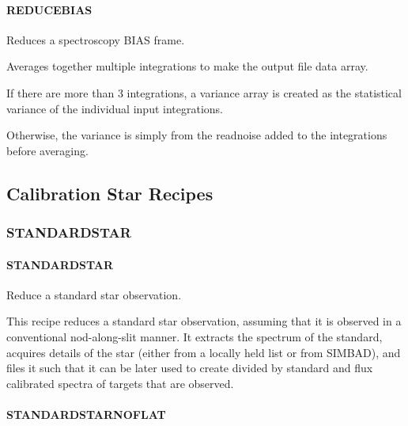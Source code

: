 \documentclass[twoside,11pt]{article}
\renewcommand{\_}{\texttt{\symbol{95}}}
\begin{document}
\paragraph{\_REDUCE\_BIAS\_\label{_REDUCE_BIAS_}}


Reduces a spectroscopy BIAS frame.


\mbox{}


Averages together multiple integrations to make the output file data array.



If there are more than 3 integrations, a variance array is created as the
statistical variance of the individual input integrations.



Otherwise, the variance is simply from the readnoise added to the integrations
before averaging.



\subsection{Calibration Star Recipes}

\subsubsection{STANDARD\_STAR}
\paragraph{STANDARD\_STAR\label{STANDARD_STAR}}


Reduce a standard star observation.


\mbox{}


This recipe reduces a standard star observation, assuming that it is
observed in a conventional nod-along-slit manner. It extracts the
spectrum of the standard, acquires details of the star (either from a
locally held list or from SIMBAD), and files it such that it can be
later used to create divided by standard and flux calibrated spectra
of targets that are observed.

\paragraph{STANDARD\_STAR\_NOFLAT\label{STANDARD_STAR_NOFLAT}}
\end{document}
